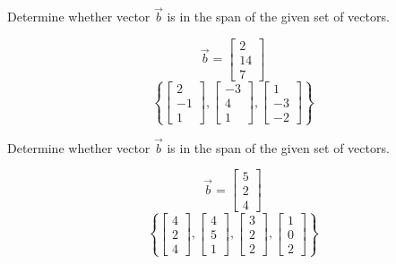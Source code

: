 \documentclass{ximera}
\begin{document}
 \begin{problem}\label{prob:spanofvect1}
 Determine whether vector $\vec{b}$ is in the span of the given set of vectors.
 
 $$\vec{b}=\begin{bmatrix}2\\14\\7\end{bmatrix}$$
 $$\left\{\begin{bmatrix}2\\-1\\1\end{bmatrix}, \begin{bmatrix}-3\\4\\1\end{bmatrix}, \begin{bmatrix}1\\-3\\-2\end{bmatrix}\right\}$$
 \begin{multipleChoice}
 \end{multipleChoice}
 \end{problem}
 
 \begin{problem}\label{prob:spanofvect2}
Determine whether vector $\vec{b}$ is in the span of the given set of vectors.
 
 $$\vec{b}=\begin{bmatrix}5\\2\\4\end{bmatrix}$$
 $$\left\{\begin{bmatrix}4\\2\\4\end{bmatrix}, \begin{bmatrix}4\\5\\1\end{bmatrix}, \begin{bmatrix}3\\2\\2\end{bmatrix}, \begin{bmatrix}1\\0\\2\end{bmatrix}\right\}$$
 \begin{multipleChoice}
 \end{multipleChoice}
 \end{problem}
 
\end{document}
